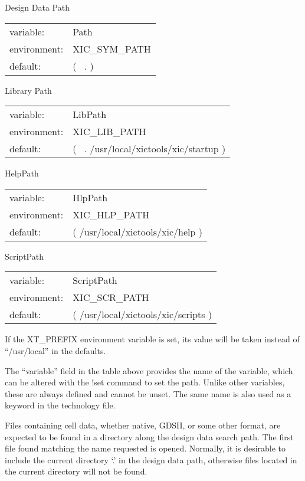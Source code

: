 \begin{itemize}
\begin{description}
\item{Design Data Path}\\
\begin{tabular}{ll}
variable: & {\et Path}\\
environment: & {\et XIC\_SYM\_PATH}\\
default: & {\vt ( ~. )}
\end{tabular}
\item{Library Path}\\
\begin{tabular}{ll}
variable: & {\et LibPath}\\
environment: & {\et XIC\_LIB\_PATH}\\
default: & {\vt ( ~. /usr/local/xictools/xic/startup )}
\end{tabular}
\item{HelpPath}\\
\begin{tabular}{ll}
variable: & {\et HlpPath}\\
environment: & {\et XIC\_HLP\_PATH}\\
default: & {\vt ( /usr/local/xictools/xic/help )}
\end{tabular}
\item{ScriptPath}\\
\begin{tabular}{ll}
variable: & {\et ScriptPath}\\
environment: & {\et XIC\_SCR\_PATH}\\
default: & {\vt ( /usr/local/xictools/xic/scripts )}
\end{tabular}
\end{description}

If the {\et XT\_PREFIX} environment variable is set, its value will be
taken instead of ``{\vt /usr/local}'' in the defaults.

The ``variable'' field in the table above provides the name of the
variable, which can be altered with the {\cb !set} command to set the
path.  Unlike other variables, these are always defined and cannot be
unset.  The same name is also used as a keyword in the technology
file.

Files containing cell data, whether {\Xic} native, GDSII, or some
other format, are expected to be found in a directory along the design
data search path.  The first file found matching the name requested is
opened.  Normally, it is desirable to include the current directory
`.' in the design data path, otherwise files located in the current
directory will not be found.


\end{itemize}
